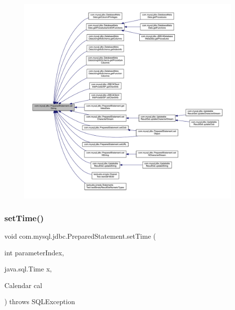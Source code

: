 \begin{figure}[H]
\begin{center}
\leavevmode
\includegraphics[width=350pt]{classcom_1_1mysql_1_1jdbc_1_1_prepared_statement_a0a4c13284de8a0257085966284a41f1d_icgraph}
\end{center}
\end{figure}
\mbox{\label{classcom_1_1mysql_1_1jdbc_1_1_prepared_statement_a4a72d22c559a4a13dc93fc5343d8bc85}} 
\subsubsection{\texorpdfstring{set\+Time()}{setTime()}\hspace{0.1cm}{\footnotesize\ttfamily [1/2]}}
{\footnotesize\ttfamily void com.\+mysql.\+jdbc.\+Prepared\+Statement.\+set\+Time (\begin{DoxyParamCaption}\item[{int}]{parameter\+Index,  }\item[{java.\+sql.\+Time}]{x,  }\item[{Calendar}]{cal }\end{DoxyParamCaption}) throws S\+Q\+L\+Exception}

